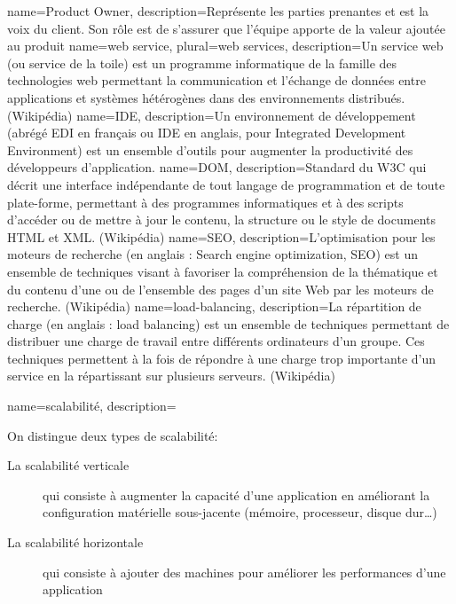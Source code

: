 {
  name=Product Owner,
  description={Représente les parties prenantes et est la voix du client. Son rôle est de s’assurer que l’équipe apporte de la valeur ajoutée au produit}
}
{
  name=web service,
  plural=web services,
  description={Un service web (ou service de la toile) est un programme informatique de la famille des technologies web permettant la communication et l'échange de données entre applications et systèmes hétérogènes dans des environnements distribués. (Wikipédia)}
}
{
  name=IDE,
  description={Un environnement de développement (abrégé EDI en français ou IDE en anglais, pour Integrated Development Environment) est un ensemble d'outils pour augmenter la productivité des développeurs d'application.}
}
{
  name=DOM,
  description={Standard du W3C qui décrit une interface indépendante de tout langage de programmation et de toute plate-forme, permettant à des programmes informatiques et à des scripts d'accéder ou de mettre à jour le contenu, la structure ou le style de documents HTML et XML. (Wikipédia)}
}
{
  name=SEO,
  description={L’optimisation pour les moteurs de recherche (en anglais : Search engine optimization, SEO) est un ensemble de techniques visant à favoriser la compréhension de la thématique et du contenu d'une ou de l'ensemble des pages d'un site Web par les moteurs de recherche. (Wikipédia)}
}
{
  name=load-balancing,
  description={La répartition de charge (en anglais : load balancing) est un ensemble de techniques permettant de distribuer une charge de travail entre différents ordinateurs d'un groupe. Ces techniques permettent à la fois de répondre à une charge trop importante d'un service en la répartissant sur plusieurs serveurs. (Wikipédia)}
}

{
  name=scalabilité,
  description={On distingue deux types de scalabilité:
\begin{description}
\item[La scalabilité verticale] qui consiste à augmenter la capacité d'une application en améliorant la configuration matérielle sous-jacente (mémoire, processeur, disque dur…)
\item[La scalabilité horizontale] qui consiste à ajouter des machines pour améliorer les performances d'une application
\end{description}}
}

